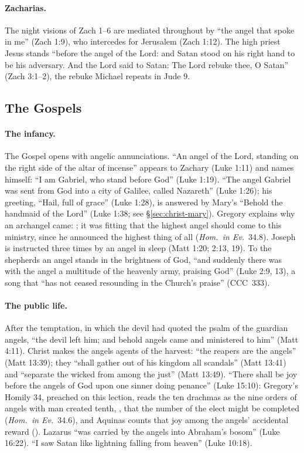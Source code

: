 \paragraph{Zacharias.} The night visions of Zach 1--6 are mediated
throughout by ``the angel that spoke in me'' (Zach 1:9), who intercedes
for Jerusalem (Zach 1:12).
The high priest Jesus stands ``before the angel of the Lord: and Satan stood
on his right hand to be his adversary. And the Lord said to Satan: The Lord
rebuke thee, O Satan'' (Zach 3:1--2), the rebuke Michael repeats in Jude 9.

\subsection{The Gospels}

\paragraph{The infancy.} The Gospel opens with angelic annunciations. ``An
angel of the Lord, standing on the right side of the altar of incense''
appears to Zachary (Luke 1:11) and names himself: ``I am Gabriel, who
stand before God'' (Luke 1:19). ``The angel Gabriel was sent from God into
a city of Galilee, called Nazareth'' (Luke 1:26); his greeting, ``Hail,
full of grace'' (Luke 1:28), is answered by Mary's ``Behold the handmaid
of the Lord'' (Luke 1:38; see \S\ref{sec:christ-mary}). Gregory explains why
an archangel came: ; it was fitting that the
highest angel should come to this ministry, since he announced the highest
thing of all (\emph{Hom.\ in Ev.}\ 34.8). Joseph is instructed three
times by an angel in sleep (Matt 1:20; 2:13, 19). To the shepherds an
angel stands in the brightness of God, ``and suddenly there was with the
angel a multitude of the heavenly army, praising God'' (Luke 2:9, 13), a
song that ``has not ceased resounding in the Church's praise'' (CCC~333).

\paragraph{The public life.} After the temptation, in which the devil had
quoted the psalm of the guardian angels, ``the devil left him; and behold
angels came and ministered to him'' (Matt 4:11). Christ makes the angels agents of the harvest: ``the reapers are the
angels'' (Matt 13:39); they ``shall gather out of his kingdom all
scandals'' (Matt 13:41) and ``separate the wicked from among the just''
(Matt 13:49). ``There shall be joy before the angels of God upon one
sinner doing penance'' (Luke 15:10): Gregory's Homily 34, preached on
this lection, reads the ten drachmas as the nine orders of angels with man
created tenth, , that the number of
the elect might be completed (\emph{Hom.\ in Ev.}\ 34.6), and Aquinas counts that joy among the angels'
accidental reward (). Lazarus ``was carried by the
angels into Abraham's bosom'' (Luke 16:22). ``I saw Satan like lightning
falling from heaven'' (Luke 10:18).

